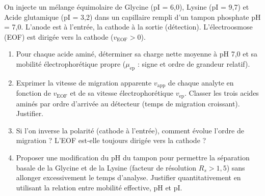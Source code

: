 \documentclass[11pt]{article}
\begin{document}
\begin{exercice}
On injecte un mélange équimolaire de Glycine (pI = 6,0), Lysine (pI = 9,7) et Acide glutamique (pI = 3,2) dans un capillaire rempli d'un tampon phosphate pH = 7,0. L'anode est à l'entrée, la cathode à la sortie (détection). L'électroosmose (EOF) est dirigée vers la cathode ($v_{\text{EOF}} > 0$).
\begin{enumerate}
    \item Pour chaque acide aminé, déterminer sa charge nette moyenne à pH 7,0 et sa mobilité électrophorétique propre ($\mu_{\text{ep}}$ : signe et ordre de grandeur relatif).
    \item Exprimer la vitesse de migration apparente $v_{\text{app}}$ de chaque analyte en fonction de $v_{\text{EOF}}$ et de sa vitesse électrophorétique $v_{\text{ep}}$. Classer les trois acides aminés par ordre d'arrivée au détecteur (temps de migration croissant). Justifier.
    \item Si l'on inverse la polarité (cathode à l'entrée), comment évolue l'ordre de migration ? L'EOF est-elle toujours dirigée vers la cathode ?
    \item Proposer une modification du pH du tampon pour permettre la séparation basale de la Glycine et de la Lysine (facteur de résolution $R_s > 1,5$) sans allonger excessivement le temps d'analyse. Justifier quantitativement en utilisant la relation entre mobilité effective, pH et pI.
\end{enumerate}
\end{exercice}
\end{document}
